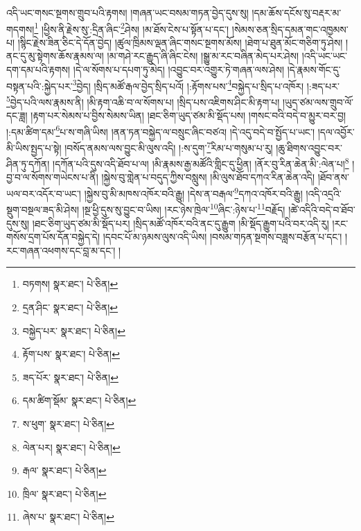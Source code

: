 འདི་ཡང་གསང་སྔགས་གྲུབ་པའི་རྟགས། །གཞན་ཡང་བསམ་གཏན་བྱེད་དུས་སུ། །དམ་ཆོས་དངོས་སུ་བརྡར་མ་གདགས།\footnote{བཏགས།  སྣར་ཐང་།  པེ་ཅིན། } །ཕྱིས་ནི་རྗེས་སུ་:དྲིན་ཞིང་\footnote{དྲན་ཤིང་  སྣར་ཐང་།  པེ་ཅིན། }ཤེས། །མ་ཐོས་ངེས་པ་སྟོན་པ་དང་། །སེམས་ཅན་སྲིད་དམན་གང་འཁྱམས་པ། །སྙིང་རྗེས་ཟིན་ཅིང་དེ་དོན་བྱེད། །ཚུལ་ཁྲིམས་ལྡན་ཞིང་གསང་སྔགས་མོས། །ཐེག་པ་ཐུན་མོང་གཅིག་ཏུ་ཤེས། །ནང་དུ་མུ་སྟེགས་ཆོས་རྣམས་ལ། །མ་གཤེ་རང་རྒྱུད་ཞི་ཞིང་ངེས། །སྒྱུ་མ་རང་བཞིན་མེད་པར་ཤེས། །འདི་ཡང་ཡང་དག་དམ་པའི་རྟགས། །དེ་ལ་སོགས་པ་དཔག་ཏུ་མེད། །འབྱུང་བར་འགྱུར་ཏེ་གཞན་ལས་ཤེས། །དེ་རྣམས་གོང་དུ་བསྟན་པའི་:སྐྱེད་པར་\footnote{བསྐྱེད་པར་  སྣར་ཐང་།  པེ་ཅིན། }བྱེད། །སྲིད་མཚོ་རྒལ་བྱེད་སྲིད་པའོ། །:རྟོགས་པས་\footnote{རྟོག་པས་  སྣར་ཐང་།  པེ་ཅིན། }བསྐྱེད་པ་སྲིད་པ་འཁོར། །:ཟད་པར་\footnote{ཟད་པོར་  སྣར་ཐང་།  པེ་ཅིན། }བྱེད་པའི་ལས་རྣམས་ནི། །མི་རྟག་འཆི་བ་ལ་སོགས་པ། །སྲིད་པས་འཇིགས་ཤིང་མི་རྟག་པ། །ཡུད་ཙམ་ལས་གྲུབ་ལོ་དང་ཟླ། །རྟག་པར་སེམས་པ་བྱིས་སེམས་ཡིན། །ཐང་ཅིག་ཡུད་ཙམ་མི་སྡོད་པས། །གསང་བའི་བདེ་བ་མྱུར་བར་བྱ། །:དམ་ཚིག་དམ་\footnote{དམ་ཚིག་སྡོམ་  སྣར་ཐང་།  པེ་ཅིན། }པ་ས་གཞི་ཡིས། །ནན་ཏན་བསྐྱེད་ལ་བསྲུང་ཞིང་བཙའ། །དེ་འདུ་བདེ་བ་སྤྱོད་པ་ཡང་། །དལ་འབྱོར་མི་ཡིས་སྤྱད་པ་སྟེ། །བསོད་ནམས་ལས་བྱུང་མི་ལུས་འདི། །:ས་དུག་\footnote{ས་ཕུག་  སྣར་ཐང་།  པེ་ཅིན། }རིམ་པ་གསུམ་པ་རུ། །ཆུ་ཐིགས་འབྱུང་བར་ཤིན་ཏུ་དཀོན། །དཀོན་པའི་དུས་འདི་ཐོབ་པ་ལ། །མི་རྣམས་རྒྱ་མཚོའི་གླིང་དུ་ཕྱིན། །ནོར་བུ་རིན་ཆེན་མི་:ལེན་པ།\footnote{ལེན་པར།  སྣར་ཐང་།  པེ་ཅིན། } །བྱ་བ་ལ་སོགས་གཡེངས་པ་ནི། །སྐྱེས་བུ་གླེན་པ་བདུད་ཀྱིས་བསླུས། །མི་ལུས་ཐོབ་དཀའ་རིན་ཆེན་འདི། །ཐོབ་ནས་ཡལ་བར་འདོར་བ་ཡང་། །སྐྱེས་བུ་མི་མཁས་འཁོར་བའི་རྒྱུ། །དེས་ན་བརྒལ་\footnote{རྒལ་  སྣར་ཐང་།  པེ་ཅིན། }དཀའ་འཁོར་བའི་རྒྱུ། །འདི་འདྲའི་སྡུག་བསྔལ་ཟད་མི་ཤེས། །སྔ་ཕྱི་དུས་སུ་བྱུང་བ་ཡིས། །རང་ཉེས་ཁྲེལ་\footnote{ཁྲིལ་  སྣར་ཐང་།  པེ་ཅིན། }ཞིང་:ཉེས་པ་\footnote{ཞེས་པ་  སྣར་ཐང་།  པེ་ཅིན། }བརྗོད། །ཚེ་འདིའི་བདེ་བ་ཐོབ་དུས་སུ། །ཐང་ཅིག་ཡུད་ཙམ་མི་སྡོད་པར། །སྲིད་མཚོ་འཁོར་བའི་ནང་དུ་རྒྱུག །མི་སྡོད་རྒྱུག་པའི་བར་འདི་རུ། །རང་གསོས་དྲག་པོས་དོན་བསྐྱེད་དེ། །དབང་པོ་མ་ཉམས་ལུས་འདི་ཡིས། །བསམ་གཏན་སྔགས་བཟླས་བརྩོན་པ་དང་། །རང་གཞན་འཕགས་དང་བླ་མ་དང་། །
